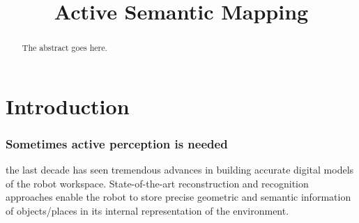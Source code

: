 \documentclass[conference]{IEEEtran}
\begin{document}
%
\title{Active Semantic Mapping}





% 
\author{
  }

\maketitle

\begin{abstract}
The abstract goes here.
\end{abstract}

%
\IEEEpeerreviewmaketitle



\section{Introduction}

\subsubsection{Sometimes active perception is needed}
the last decade has seen tremendous advances in building accurate
digital models of the robot workspace. State-of-the-art reconstruction
and recognition approaches enable the robot to store precise geometric
and semantic information of objects/places in its internal
representation of the environment.
\end{document}
